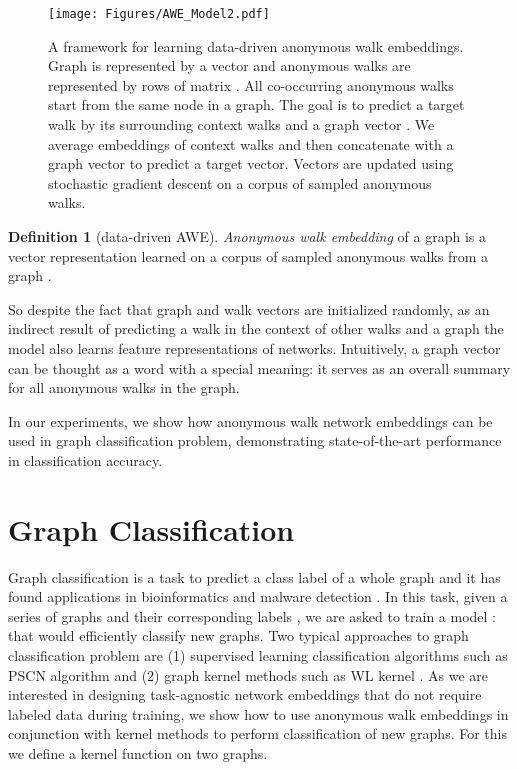 \documentclass{article}
\theoremstyle{definition}
\newtheorem{definition}{Definition}
\begin{document}
\begin{figure}[t]
\centering
    \texttt{[image: Figures/AWE\_Model2.pdf]}
\caption{A framework for learning data-driven anonymous walk embeddings. Graph is represented by a vector  and anonymous walks are represented by rows of matrix . All co-occurring anonymous walks start from the same node in a graph. The goal is to predict a target walk  by its surrounding context walks  and a graph vector . We average embeddings of context walks and then concatenate with a graph vector to predict a target vector. Vectors are updated using stochastic gradient descent on a corpus of sampled anonymous walks.}\label{awe_model}
\end{figure}

\begin{definition}[data-driven AWE]
\textit{Anonymous walk embedding} of a graph  is a vector representation  learned on a corpus of sampled anonymous walks from a graph . 
\label{awedb}
\end{definition}

So despite the fact that graph and walk vectors are initialized randomly, as an indirect result of predicting a walk in the context of other walks and a graph the model also learns feature representations of networks. Intuitively, a graph vector can be thought as a word with a special meaning: it serves as an overall summary for all anonymous walks in the graph. 

In our experiments, we show how anonymous walk network embeddings can be used in graph classification problem, demonstrating state-of-the-art performance in classification accuracy. 

\section{Graph Classification}
Graph classification is a task to predict a class label of a whole graph and it has found applications in bioinformatics \cite{matching} and malware detection \cite{graph2vec:algo}. In this task, given a series of  graphs  and their corresponding labels , we are asked to train a model :  that would efficiently classify new graphs. 
Two typical approaches to graph classification problem are (1) supervised learning classification algorithms such as PSCN algorithm \cite{learncnn:16} and (2) graph kernel methods such as WL kernel \cite{wlkernel:11}. As we are  interested in designing task-agnostic network embeddings that do not require labeled data during training, we show how to use anonymous walk embeddings in conjunction with kernel methods to perform classification of new graphs. For this we define a kernel function on two graphs. 
\end{document}
